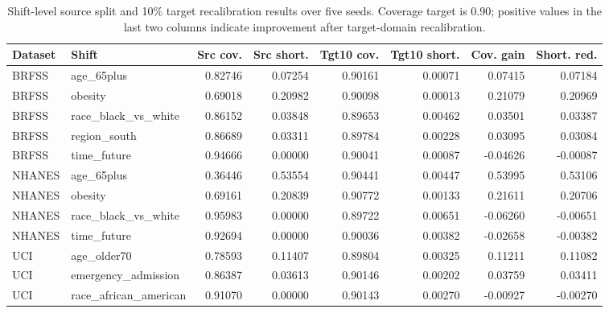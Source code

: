\begin{table}[!tbp]
\centering
\caption{Shift-level source split and 10\% target recalibration results over five seeds. Coverage target is 0.90; positive values in the last two columns indicate improvement after target-domain recalibration.}
\label{primary-tab:shift_level_results}
\scriptsize
\setlength{\tabcolsep}{3pt}
\begin{adjustbox}{max width=\textwidth}
\begin{tabular}{llrrrrrr}
\toprule
Dataset & Shift & Src cov. & Src short. & Tgt10 cov. & Tgt10 short. & Cov. gain & Short. red. \\
\midrule
BRFSS & age\_65plus & 0.82746 & 0.07254 & 0.90161 & 0.00071 & 0.07415 & 0.07184 \\
BRFSS & obesity & 0.69018 & 0.20982 & 0.90098 & 0.00013 & 0.21079 & 0.20969 \\
BRFSS & race\_black\_vs\_white & 0.86152 & 0.03848 & 0.89653 & 0.00462 & 0.03501 & 0.03387 \\
BRFSS & region\_south & 0.86689 & 0.03311 & 0.89784 & 0.00228 & 0.03095 & 0.03084 \\
BRFSS & time\_future & 0.94666 & 0.00000 & 0.90041 & 0.00087 & -0.04626 & -0.00087 \\
NHANES & age\_65plus & 0.36446 & 0.53554 & 0.90441 & 0.00447 & 0.53995 & 0.53106 \\
NHANES & obesity & 0.69161 & 0.20839 & 0.90772 & 0.00133 & 0.21611 & 0.20706 \\
NHANES & race\_black\_vs\_white & 0.95983 & 0.00000 & 0.89722 & 0.00651 & -0.06260 & -0.00651 \\
NHANES & time\_future & 0.92694 & 0.00000 & 0.90036 & 0.00382 & -0.02658 & -0.00382 \\
UCI & age\_older70 & 0.78593 & 0.11407 & 0.89804 & 0.00325 & 0.11211 & 0.11082 \\
UCI & emergency\_admission & 0.86387 & 0.03613 & 0.90146 & 0.00202 & 0.03759 & 0.03411 \\
UCI & race\_african\_american & 0.91070 & 0.00000 & 0.90143 & 0.00270 & -0.00927 & -0.00270 \\
\bottomrule
\end{tabular}
\end{adjustbox}
\end{table}

